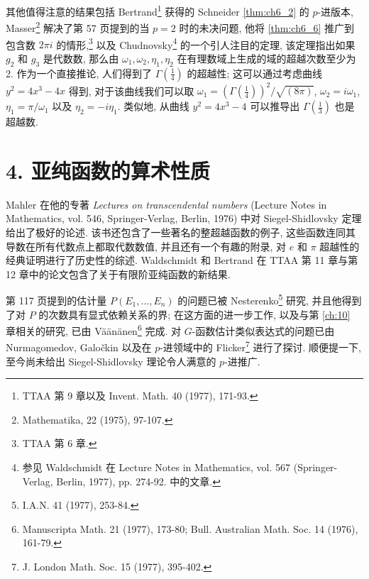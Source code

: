 其他值得注意的结果包括 Bertrand\footnote{TTAA 第 9 章以及 Invent. Math. 40 (1977), 171-93.} 获得的 Schneider \autoref{thm:ch6_2} 的 \(p\)-进版本, Masser\footnote{Mathematika, 22 (1975), 97-107.} 解决了第 57 页提到的当 \(p=2\) 时的未决问题, 他将 \autoref{thm:ch6_6} 推广到包含数 \(2\pi i\) 的情形,\footnote{TTAA 第 6 章.} 以及 Chudnovsky\footnote{参见 Waldschmidt 在 Lecture Notes in Mathematics, vol. 567 (Springer-Verlag, Berlin, 1977), pp. 274-92. 中的文章.} 的一个引人注目的定理, 该定理指出如果 \(g_2\) 和 \(g_3\) 是代数数, 那么由 \(\omega_1, \omega_2, \eta_1, \eta_2\) 在有理数域上生成的域的超越次数至少为 2. 作为一个直接推论, 人们得到了 \(\Gamma(\frac{1}{4})\) 的超越性; 这可以通过考虑曲线 \(y^2 = 4x^3 - 4x\) 得到, 对于该曲线我们可以取 \(\omega_1 = (\Gamma(\frac{1}{4}))^2/\sqrt{(8\pi)}\), \(\omega_2 = i\omega_1\), \(\eta_1 = \pi/\omega_1\) 以及 \(\eta_2 = -i\eta_1\). 类似地, 从曲线 \(y^2 = 4x^3 - 4\) 可以推导出 \(\Gamma(\frac{1}{3})\) 也是超越数.

\section*{4. 亚纯函数的算术性质}

Mahler 在他的专著 \textit{Lectures on transcendental numbers} (Lecture Notes in Mathematics, vol. 546, Springer-Verlag, Berlin, 1976) 中对 Siegel-Shidlovsky 定理给出了极好的论述. 该书还包含了一些著名的整超越函数的例子, 这些函数连同其导数在所有代数点上都取代数数值, 并且还有一个有趣的附录, 对 \(e\) 和 \(\pi\) 超越性的经典证明进行了历史性的综述. Waldschmidt 和 Bertrand 在 TTAA 第 11 章与第 12 章中的论文包含了关于有限阶亚纯函数的新结果.

第 117 页提到的估计量 \(P(E_1, \dots, E_n)\) 的问题已被 Nesterenko\footnote{I.A.N. 41 (1977), 253-84.} 研究, 并且他得到了对 \(P\) 的次数具有显式依赖关系的界; 在这方面的进一步工作, 以及与第 \autoref{ch:10} 章相关的研究, 已由 V{\"a}{\"a}n{\"a}nen\footnote{Manuscripta Math. 21 (1977), 173-80; Bull. Australian Math. Soc. 14 (1976), 161-79.} 完成. 对 \(G\)-函数估计类似表达式的问题已由 Nurmagomedov, Galo\v{c}kin 以及在 \(p\)-进领域中的 Flicker\footnote{J. London Math. Soc. 15 (1977), 395-402.} 进行了探讨. 顺便提一下, 至今尚未给出 Siegel-Shidlovsky 理论令人满意的 \(p\)-进推广.

